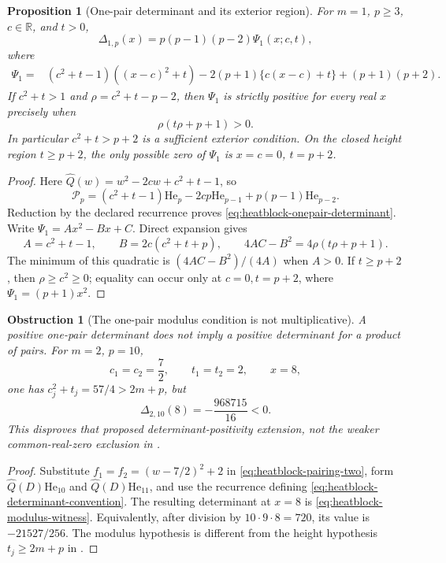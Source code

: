 \documentclass[11pt]{article}
\newtheorem{proposition}[theorem]{Proposition}
\newtheorem{obstruction}[theorem]{Obstruction}
\theoremstyle{definition}
\theoremstyle{remark}
\newcommand{\R}{\mathbb R}
\begin{document}
\begin{proposition}[One-pair determinant and its exterior region]
\label{prop:heatblock-onepair-determinant}
For $m=1$, $p\ge3$, $c\in\R$, and $t>0$,
\begin{equation}
 \Delta_{1,p}(x)=p(p-1)(p-2)\Psi_1(x;c,t),
 \label{eq:heatblock-onepair-determinant}
\end{equation}
where
\begin{align}
 \Psi_1={}&(c^2+t-1)((x-c)^2+t)
        -2(p+1)\{c(x-c)+t\}+(p+1)(p+2).
 \label{eq:heatblock-onepair-psi}
\end{align}
If $c^2+t>1$ and $\rho=c^2+t-p-2$, then $\Psi_1$ is strictly
positive for every real $x$ precisely when
\begin{equation}
 \rho(t\rho+p+1)>0.
 \label{eq:heatblock-onepair-exact-region}
\end{equation}
In particular $c^2+t>p+2$ is a sufficient exterior condition.
On the closed height region $t\ge p+2$, the only possible zero of
$\Psi_1$ is $x=c=0$, $t=p+2$.
\end{proposition}

\begin{proof}
Here $\widehat Q(w)=w^2-2cw+c^2+t-1$, so
\[
 \mathcal P_p=(c^2+t-1)\mathrm{He}_p
 -2cp\mathrm{He}_{p-1}+p(p-1)\mathrm{He}_{p-2}.
\]
Reduction by the declared recurrence proves
\eqref{eq:heatblock-onepair-determinant}.  Write
$\Psi_1=Ax^2-Bx+C$.  Direct expansion gives
\[
 A=c^2+t-1,\qquad B=2c(c^2+t+p),\qquad
 4AC-B^2=4\rho(t\rho+p+1).
\]
The minimum of this quadratic is $(4AC-B^2)/(4A)$ when $A>0$.
If $t\ge p+2$, then $\rho\ge c^2\ge0$; equality can occur only
at $c=0,t=p+2$, where $\Psi_1=(p+1)x^2$.
\end{proof}

\begin{obstruction}[The one-pair modulus condition is not multiplicative]
\label{obs:heatblock-modulus-determinant}
A positive one-pair determinant does not imply a positive determinant
for a product of pairs.  For $m=2$, $p=10$,
\[
 c_1=c_2=\frac72,\qquad t_1=t_2=2,\qquad x=8,
\]
one has $c_j^2+t_j=57/4>2m+p$, but
\begin{equation}
 \Delta_{2,10}(8)=-\frac{968715}{16}<0.
 \label{eq:heatblock-modulus-witness}
\end{equation}
This disproves that proposed determinant-positivity extension, not the
weaker common-real-zero exclusion in .
\end{obstruction}

\begin{proof}
Substitute $f_1=f_2=(w-7/2)^2+2$ in
\eqref{eq:heatblock-pairing-two}, form $\widehat Q(D)\mathrm{He}_{10}$
and $\widehat Q(D)\mathrm{He}_{11}$, and use the recurrence defining
\eqref{eq:heatblock-determinant-convention}.  The resulting determinant
at $x=8$ is \eqref{eq:heatblock-modulus-witness}.  Equivalently, after
division by $10\cdot9\cdot8=720$, its value is $-21527/256$.
The modulus hypothesis is different from the height hypothesis
$t_j\ge2m+p$ in .
\end{proof}
\end{document}
